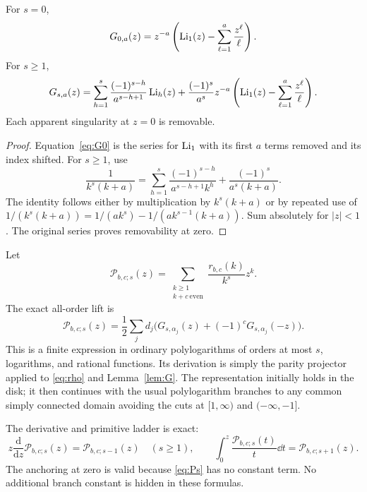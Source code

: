 \begin{lemma}\label{lem:G}
For $s=0$,
\begin{equation}\label{eq:G0}
 G_{0,a}(z)=z^{-a}\left(\operatorname{Li}_1(z)-\sum_{\ell=1}^{a}\frac{z^\ell}{\ell}\right).
\end{equation}
For $s\ge1$,
\begin{equation}\label{eq:Gs}
 G_{s,a}(z)=\sum_{h=1}^{s}\frac{(-1)^{s-h}}{a^{s-h+1}}\operatorname{Li}_h(z)
 +\frac{(-1)^s}{a^s}z^{-a}
       \left(\operatorname{Li}_1(z)-\sum_{\ell=1}^{a}\frac{z^\ell}{\ell}\right).
\end{equation}
Each apparent singularity at $z=0$ is removable.
\end{lemma}
\begin{proof}
Equation~\eqref{eq:G0} is the series for $\operatorname{Li}_1$ with its first $a$ terms removed and its index shifted. For $s\ge1$, use
\[
 \frac1{k^s(k+a)}=
 \sum_{h=1}^{s}\frac{(-1)^{s-h}}{a^{s-h+1}k^h}
 +\frac{(-1)^s}{a^s(k+a)}.
\]
The identity follows either by multiplication by $k^s(k+a)$ or by repeated use of $1/(k^s(k+a))=1/(ak^s)-1/(ak^{s-1}(k+a))$. Sum absolutely for $|z|<1$. The original series proves removability at zero.
\end{proof}

Let
\begin{equation}\label{eq:Ps}
 \mathcal P_{b,c;s}(z)=
 \sum_{\substack{k\ge1\\k+c\ \mathrm{even}}}
       \frac{r_{b,c}(k)}{k^s}z^k.
\end{equation}
The exact all-order lift is
\begin{equation}\label{eq:polylog-lift}
 \boxed{\displaystyle
 \mathcal P_{b,c;s}(z)=\frac12\sum_jd_j
     \bigl(G_{s,\alpha_j}(z)+(-1)^cG_{s,\alpha_j}(-z)\bigr).}
\end{equation}
This is a finite expression in ordinary polylogarithms of orders at most $s$, logarithms, and rational functions. Its derivation is simply the parity projector applied to \eqref{eq:rho} and Lemma~\ref{lem:G}. The representation initially holds in the disk; it then continues with the usual polylogarithm branches to any common simply connected domain avoiding the cuts at $[1,\infty)$ and $(-\infty,-1]$.

The derivative and primitive ladder is exact:
\begin{equation}\label{eq:polylog-ladder}
 z\frac{\mathrm d}{\mathrm dz}\mathcal P_{b,c;s}(z)
 =\mathcal P_{b,c;s-1}(z)\quad(s\ge1),\qquad
 \int_0^z\frac{\mathcal P_{b,c;s}(t)}t\dd t
 =\mathcal P_{b,c;s+1}(z).
\end{equation}
The anchoring at zero is valid because \eqref{eq:Ps} has no constant term. No additional branch constant is hidden in these formulas.

